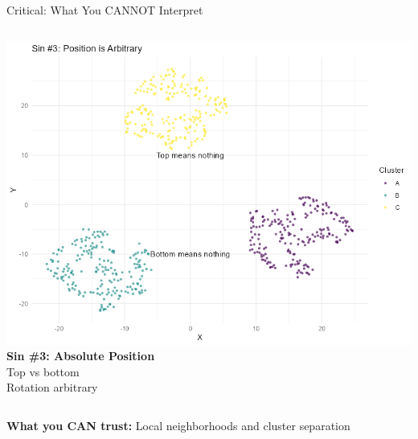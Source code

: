 \documentclass[aspectratio=169]{beamer}
\begin{document}
\begin{frame}{Critical: What You CANNOT Interpret}
\begin{columns}
\includegraphics[width=\textwidth]{./Figures/sin3_position.png}
\textbf{Sin \#3: Absolute Position}\\
Top vs bottom\\
Rotation arbitrary
\end{columns}

\vspace{0.3cm}
\colorbox{green!30}{\textbf{What you CAN trust:} Local neighborhoods and cluster separation}
\end{frame}
\end{document}
